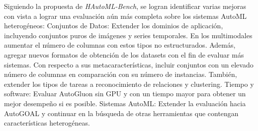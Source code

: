 \begin{recomendations}
Siguiendo la propuesta de \textit{HAutoML-Bench}, se logran identificar varias mejoras con vista a lograr una evaluación aún más completa sobre los 
sistemas AutoML heterogéneos: 
\newline
\newline
Conjuntos de Datos: Extender los dominios de aplicación, incluyendo conjuntos puros de imágenes y series temporales. En los multimodales
aumentar el número de columnas con estos tipos no estructurados. Además, agregar nuevos formatos de obtención de los datasets con el fin de 
evaluar más sistemas. Con respecto a sus metacaracterísticas, incluir conjuntos con un elevado número de columnas en comparación con su número de instancias.
También, extender los tipos de tareas a reconocimiento de relaciones y clustering.
\newline
\newline
Tiempo y software: Evaluar AutoGluon sin GPU y con un tiempo mayor para obtener un mejor desempeño si es posible.
\newline
\newline
Sistemas AutoML: Extender la evaluación hacia AutoGOAL y continuar en la búsqueda de otras herramientas que contengan características heterogéneas.

\end{recomendations}
